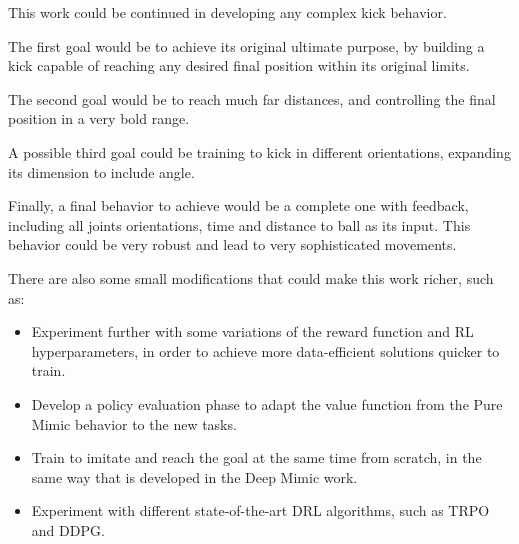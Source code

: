 This work could be continued in developing any complex kick behavior.

The first goal would be to achieve its original ultimate purpose, by building a kick capable of reaching any desired final position within its original limits.

The second goal would be to reach much far distances, and controlling the final position in a very bold range.

A possible third goal could be training to kick in different orientations, expanding its dimension to include angle.

Finally, a final behavior to achieve would be a complete one with feedback, including all joints orientations, time and distance to ball as its input. This behavior could be very robust and lead to very sophisticated movements.

There are also some small modifications that could make this work richer, such as:

\begin{itemize}
\item Experiment further with some variations of the reward function and RL hyperparameters, in order to achieve more data-efficient solutions quicker to train.

\item Develop a policy evaluation phase to adapt the value function from the Pure Mimic behavior to the new tasks.

\item Train to imitate and reach the goal at the same time from scratch, in the same way that is developed in the Deep Mimic work.

\item Experiment with different state-of-the-art DRL algorithms, such as TRPO and DDPG.
\end{itemize}


